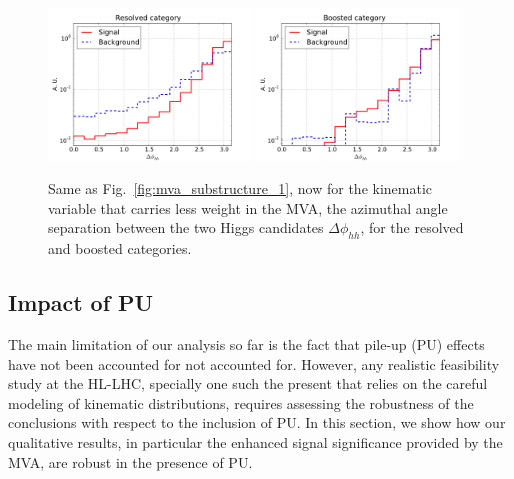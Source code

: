 \begin{figure}[t]
  \begin{center}
  \includegraphics[width=0.48\textwidth]{plots/DeltaPhi_HH_C1_res.pdf} 
  \includegraphics[width=0.48\textwidth]{plots/DeltaPhi_HH_C1_boosted.pdf} 
  \caption{\small Same as Fig.~\ref{fig:mva_substructure_1},
    now for the kinematic variable that carries less weight in the MVA,
    the azimuthal angle separation between the two Higgs candidates
    $\Delta\phi_{hh}$, for the resolved and boosted categories.
}
\label{fig:mva_substructure_2}
\end{center}
\end{figure}

\subsection{Impact of PU}

The main limitation of our analysis so far is the fact that
pile-up (PU) effects have not been accounted for
not accounted for.
%
However, any realistic feasibility study at the HL-LHC, specially
one 
such the present that relies on the careful modeling
of kinematic distributions,
requires assessing the robustness of the conclusions
with respect to the inclusion of PU.
%
In this section, we show how our qualitative results, in particular
the enhanced signal significance provided by the MVA, are robust
in the presence of  PU.

